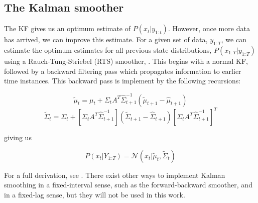 \subsection{The Kalman smoother}

The KF gives us an optimum estimate of $P(x_t|y_{1:t})$. However, once more data has arrived, we can improve this estimate. For a given set of data, $y_{1:T}$, we can estimate the optimum estimates for all previous state distributions, $P(x_{1:T}| y_{1:T})$ using a Rauch-Tung-Striebel (RTS) smoother, \cite{Rauch1965}. This begins with a normal KF, followed by a backward filtering pass which propagates information to earlier time instances. This backward pass is implement by the following recursions:

\begin{equation}
\tilde{\mu}_t = \mu_{t} + \Sigma_t A^T \hat{\Sigma}_{t+1}^{-1} (\tilde{\mu}_{t+1} - \hat{\mu}_{t+1})
\label{eq:RTS_mean}
\end{equation}
\begin{equation}
\tilde{\Sigma}_t = \Sigma_{t} + [\Sigma_t A^T \hat{\Sigma}_{t+1}^{-1}] (\tilde{\Sigma}_{t+1} - \hat{\Sigma}_{t+1}) [\Sigma_t A^T \hat{\Sigma}_{t+1}^{-1}]^T
\label{eq:RTS_covar}
\end{equation}

giving us

\begin{equation}
P(x_t|Y_{1:T}) = \mathcal{N}(x_t|\tilde{\mu}_t, \tilde{\Sigma}_{t})
\end{equation}

For a full derivation, see \cite{Rauch1965}. There exist other ways to implement Kalman smoothing in a fixed-interval sense, such as the forward-backward smoother, and in a fixed-lag sense, but they will not be used in this work.